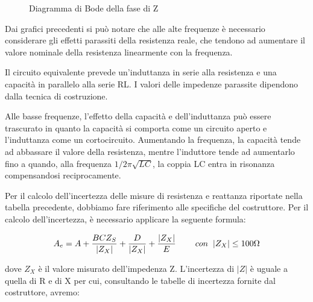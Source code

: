 \begin{figure}[h]
    \centering
    \caption{Diagramma di Bode della fase di Z}
    \label{fig:fase}
\end{figure}
\FloatBarrier
\clearpage

Dai grafici precedenti si può notare che alle alte frequenze è necessario considerare gli effetti parassiti della resistenza reale, che tendono ad aumentare il valore nominale della resistenza linearmente con la frequenza.

Il circuito equivalente prevede un'induttanza in serie alla resistenza e una capacità in parallelo alla serie RL. I valori delle impedenze parassite dipendono dalla tecnica di costruzione.

Alle basse frequenze, l'effetto della capacità e dell'induttanza può essere trascurato in quanto la capacità si comporta come un circuito aperto e l'induttanza come un cortocircuito. Aumentando la frequenza, la capacità tende ad abbassare il valore della resistenza, mentre l'induttore tende ad aumentarlo fino a quando, alla frequenza $1/2\pi\sqrt{LC}$, la coppia LC entra in risonanza compensandosi reciprocamente.

Per il calcolo dell'incertezza delle misure di resistenza e reattanza riportate nella tabella precedente, dobbiamo fare riferimento alle specifiche del costruttore. Per il calcolo dell'incertezza, è necessario applicare la seguente formula:

\begin{equation}
    A_e = A + \frac{BCZ_S}{|Z_X|} + \frac{D}{|Z_X|} + \frac{|Z_X|}{E} \hspace{0,8cm} con \hspace{0,2cm} |Z_X| \leq 100\Omega
\end{equation}

dove $Z_X$ è il valore misurato dell’impedenza Z. L’incertezza di $|Z|$ è uguale a quella di 
R e di X per cui, consultando le tabelle di incertezza fornite dal costruttore, avremo:


